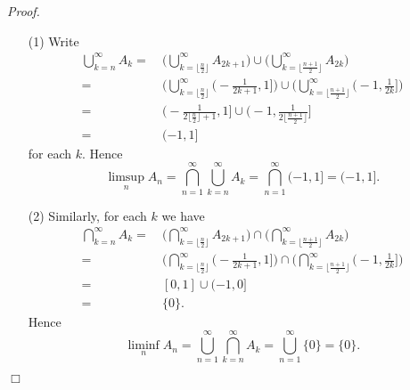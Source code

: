 \documentclass{article}
\begin{document}
\emph{Proof.}
\begin{enumerate}
\item[(1)]
  Write
  \begin{align*}
    \bigcup_{k=n}^{\infty} A_k
    =
    & \:
      \Bigg( \bigcup_{k=\lfloor \frac{n}{2} \rfloor}^{\infty} A_{2k+1} \Bigg) \cup
      \Bigg( \bigcup_{k=\lfloor \frac{n+1}{2} \rfloor}^{\infty} A_{2k} \Bigg) \\
    =
    & \:
      \Bigg( \bigcup_{k=\lfloor \frac{n}{2} \rfloor}^{\infty} \bigg( -\frac{1}{2k+1},1 \bigg] \Bigg)
      \cup
      \Bigg( \bigcup_{k=\lfloor \frac{n+1}{2} \rfloor}^{\infty} \bigg( -1, \frac{1}{2k} \bigg] \Bigg) \\
    =
    & \:
      \bigg( -\frac{1}{2\lfloor \frac{n}{2} \rfloor+1},1 \bigg]
      \cup
      \bigg( -1, \frac{1}{2\lfloor \frac{n+1}{2} \rfloor} \bigg] \\
    =
    & \:
      (-1, 1]
  \end{align*}
  for each $k$.
  Hence
  \[
    \limsup_n A_n
    = \bigcap_{n=1}^{\infty} \bigcup_{k=n}^{\infty} A_k
    = \bigcap_{n=1}^{\infty} (-1, 1]
    = (-1, 1].
  \]

\item[(2)]
  Similarly, for each $k$ we have
  \begin{align*}
    \bigcap_{k=n}^{\infty} A_k
    =
    & \:
      \Bigg( \bigcap_{k=\lfloor \frac{n}{2} \rfloor}^{\infty} A_{2k+1} \Bigg) \cap
      \Bigg( \bigcap_{k=\lfloor \frac{n+1}{2} \rfloor}^{\infty} A_{2k} \Bigg) \\
    =
    & \:
      \Bigg( \bigcap_{k=\lfloor \frac{n}{2} \rfloor}^{\infty} \bigg( -\frac{1}{2k+1},1 \bigg] \Bigg)
      \cap
      \Bigg( \bigcap_{k=\lfloor \frac{n+1}{2} \rfloor}^{\infty} \bigg( -1, \frac{1}{2k} \bigg] \Bigg) \\
    =
    & \:
      [0,1] \cup (-1,0] \\
    =
    & \:
      \{ 0 \}.
  \end{align*}
  Hence
  \[
    \liminf_n A_n
    = \bigcup_{n=1}^{\infty} \bigcap_{k=n}^{\infty} A_k
    = \bigcup_{n=1}^{\infty} \{ 0 \}
    = \{ 0 \}.
  \]
\end{enumerate}
$\Box$ \\\\





\end{document}
